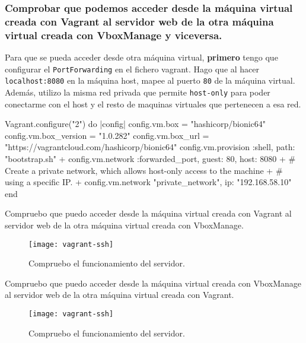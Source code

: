 \subsubsection{Comprobar que podemos acceder desde la máquina virtual creada con Vagrant al servidor web de la otra máquina virtual creada con VboxManage y viceversa.}
\par Para que se pueda acceder desde otra máquina virtual, \textbf{primero} tengo que configurar el 
\texttt{PortForwarding} en el fichero vagrant. Hago que al hacer \texttt{localhost:8080} en
la máquina host, mapee al puerto \texttt{80} de la máquina virtual. Además, utilizo la misma 
red privada que permite \texttt{host-only} para poder conectarme con el host y el resto 
de maquinas virtuales que pertenecen a esa red.
\begin{listing}
    Vagrant.configure("2") do |config|
        config.vm.box = "hashicorp/bionic64"
        config.vm.box_version = "1.0.282"
        config.vm.box_url = "https://vagrantcloud.com/hashicorp/bionic64"
        config.vm.provision :shell, path: "bootstrap.sh"
  +     config.vm.network :forwarded_port, guest: 80, host: 8080
  +     # Create a private network, which allows host-only access to the machine
  +     # using a specific IP.
  +     config.vm.network "private_network", ip: "192.168.58.10"
    end
 \end{listing}
\par Compruebo que puedo acceder desde la máquina virtual creada con Vagrant al servidor web de la otra máquina virtual creada con VboxManage.
  \begin{figure}[H]
    \texttt{[image: vagrant-ssh]}
    \centering
    \caption{Compruebo el funcionamiento del servidor.}
    \label{fig:vagrant-ssh}
 \end{figure}
\par Compruebo que puedo acceder desde la máquina virtual creada con VboxManage al servidor web de la otra máquina virtual creada con Vagrant.
  \begin{figure}[H]
    \texttt{[image: vagrant-ssh]}
    \centering
    \caption{Compruebo el funcionamiento del servidor.}
    \label{fig:vagrant-ssh}
 \end{figure}
